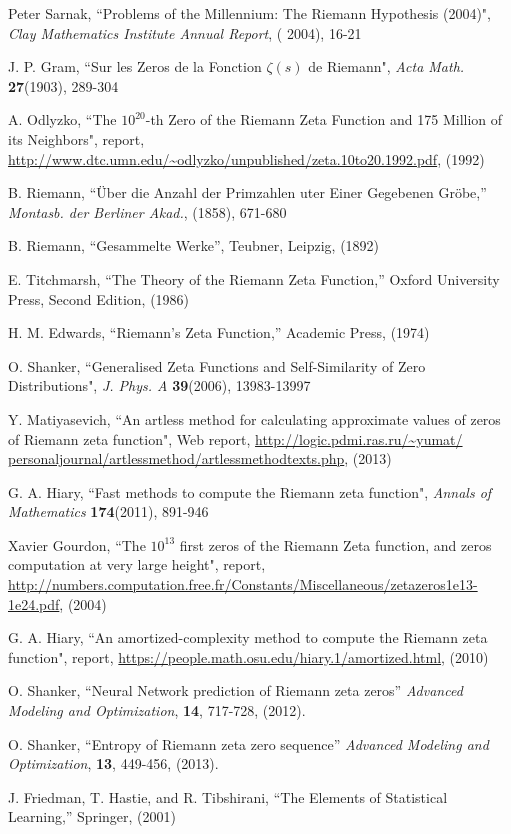 \documentclass[twoside]{article}
\theoremstyle{definition}
\begin{document}
\begin{thebibliography} {}

 Peter Sarnak,
``Problems of the Millennium: The Riemann Hypothesis (2004)",  {\it Clay Mathematics Institute Annual Report}, ( 2004), 
16-21

 J. P. Gram, 
``Sur les Zeros de la Fonction  $\zeta ( s )$  de Riemann",
{\it Acta Math.} {\bf27}(1903), 289-304

  A. Odlyzko,
``The $10^{20}$-th Zero of the Riemann Zeta
Function and 175 Million of its Neighbors", report,
\url{http://www.dtc.umn.edu/~odlyzko/unpublished/zeta.10to20.1992.pdf}, (1992)


 B. Riemann, ``\"{U}ber die Anzahl der Primzahlen uter
Einer Gegebenen Gr\"{o}be,'' {\it Montasb. der Berliner Akad.}, (1858),
671-680

 B. Riemann, ``Gesammelte Werke'', Teubner, Leipzig, (1892)

 E. Titchmarsh, ``The Theory of the Riemann Zeta
Function,'' Oxford University Press, Second Edition, (1986)

 H. M. Edwards, ``Riemann's Zeta Function,''
Academic Press,  (1974)

 O. Shanker, 
``Generalised Zeta Functions and Self-Similarity of Zero Distributions",
{\it J.  Phys. A} {\bf39}(2006), 13983-13997

 Y. Matiyasevich, 
``An artless method for calculating approximate values of
zeros of Riemann zeta function",
Web report, \url{http://logic.pdmi.ras.ru/~yumat/
personaljournal/artlessmethod/artlessmethodtexts.php}, (2013)

 G. A. Hiary,
``Fast methods to compute the Riemann zeta function",
{\it Annals of Mathematics} {\bf174}(2011), 891-946

 Xavier Gourdon,
``The $10^{13}$ first zeros of the Riemann Zeta function,
and zeros computation at very large height", report,
\url{http://numbers.computation.free.fr/Constants/Miscellaneous/zetazeros1e13-1e24.pdf}, (2004)

 G. A. Hiary,
``An amortized-complexity method to compute the Riemann zeta function", report,
\url{https://people.math.osu.edu/hiary.1/amortized.html}, (2010)

 O. Shanker, ``Neural Network prediction of Riemann zeta zeros''
{\it Advanced Modeling and Optimization}, {\bf 14}, 717-728, (2012). 

 O. Shanker, ``Entropy of Riemann zeta zero sequence''
{\it Advanced Modeling and Optimization}, {\bf 13}, 449-456, (2013). 

 J. Friedman, T. Hastie, and R. Tibshirani, ``The Elements of Statistical Learning,''
Springer,  (2001) 

\end{thebibliography} 
\end{document}
